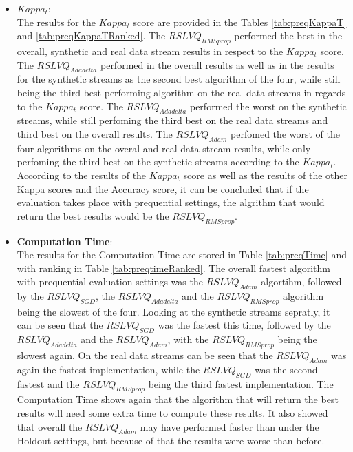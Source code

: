 \documentclass[12pt,oneside,a4paper,parskip]{scrbook}
\begin{document}
\begin{itemize}
  \item \textbf{$Kappa_t$}: \\
  The results for the $Kappa_t$ score are provided in the Tables \ref{tab:preqKappaT} and \ref{tab:preqKappaTRanked}.
  The $RSLVQ_\textit{RMSprop}$ performed the best in the overall, synthetic and real data stream results in respect to the
  $Kappa_t$ score. The $RSLVQ_\textit{Adadelta}$ performed in the overall results as well as in the results for the synthetic streams 
  as the second best algorithm of the four, while still being the third best performing algorithm on the real data streams in regards to 
  the $Kappa_t$ score. The $RSLVQ_\textit{Adadelta}$ performed the worst on the synthetic streams, while still perfoming the third best on 
  the real data streams and third best on the overall results.
  The $RSLVQ_\textit{Adam}$ perfomed the worst of the four algorithms on the overal and real data stream results, while only perfoming the third best
  on the synthetic streams according to the $Kappa_t$.
  According to the results of the $Kappa_t$ score as well as the results of the other Kappa scores and the Accuracy score, it can 
  be concluded that if the evaluation takes place with prequential settings, the algrithm that would return the best results would be the
  $RSLVQ_\textit{RMSprop}$.
  
  \item \textbf{Computation Time}: \\
  The results for the Computation Time are stored in Table \ref{tab:preqTime} and with ranking in Table \ref{tab:preqtimeRanked}.
  The overall fastest algorithm with prequential evaluation settings was the $RSLVQ_\textit{Adam}$ algortihm, followed by the 
  $RSLVQ_\textit{SGD}$, the $RSLVQ_\textit{Adadelta}$ and the $RSLVQ_\textit{RMSprop}$ algorithm being the slowest of the four.
  Looking at the synthetic streams sepratly, it can be seen that the $RSLVQ_\textit{SGD}$ was the fastest this time,
  followed by the $RSLVQ_\textit{Adadelta}$ and the $RSLVQ_\textit{Adam}$, with the $RSLVQ_\textit{RMSprop}$ being the slowest again.
  On the real data streams can be seen that the $RSLVQ_\textit{Adam}$ was again the fastest implementation, while the $RSLVQ_\textit{SGD}$
  was the second fastest and the $RSLVQ_\textit{RMSprop}$ being the third fastest implementation.
  The Computation Time shows again that the algorithm that will return the best results will need some extra time to compute
  these results.
  It also showed that overall the $RSLVQ_\textit{Adam}$ may have performed faster than under the Holdout settings, but because of that
  the results were worse than before.
  
\end{itemize}
\end{document}
